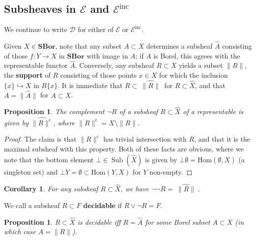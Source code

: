 \documentclass[11pt]{amsart}
\newcommand\alttext{\texorpdfstring}
\newcommand\cD{\mathcal{D}}
\newcommand\cE{\mathcal{E}}
\newcommand\cm{\mathrm{c}}
\newcommand\defword[1]{\textbf{#1}}
\newcommand\Hom{\mathrm{Hom}}
\newcommand\hto{\hookrightarrow}
\newcommand\inc{\mathrm{inc}}
\newcommand\norm[2][]{#1\lVert{#2}#1\rVert}
\newcommand\SBor{\mathbf{SBor}}
\newcommand\set[2][]{#1\{{#2}#1\}}
\newcommand\Sub{\operatorname{Sub}}
\newcommand\wh[1]{\widehat{#1}}
\theoremstyle{definition}
\theoremstyle{remark}
\theoremstyle{plain}
\newtheorem{propn}[defn]{Proposition}
\newtheorem{cor}[defn]{Corollary}
\begin{document}
\subsection{Subsheaves in \alttext{\( \cE \)}{E} and \alttext{\( \cE^{\inc} \)}{Eⁱⁿᶜ}} \label{subsec:subsheaves-in-e}
We continue to write \( \cD \) for either of \( \cE \) or \( \cE^{\inc} \).

Given \( X \in \SBor \), note that any subset \( A \subset X \) determines a subsheaf \( \wh A \) consisting of those \( f \colon Y \to X \) in \( \SBor \) with image in \( A \); if \( A \) is Borel, this agrees with the representable functor \( \wh A \).
Conversely, any subsheaf \( R \subset X \) yields a subset \( \norm{R} \), the \defword{support} of \( R \) consisting of those points \( x \in X \) for which the inclusion \( \set{x} \hto X \) in \( R \set{x} \).
It is immediate that \( R \subset \wh{\ \norm{R}\ } \) for \( R \subset \wh X \), and that \( A = \norm{\wh A} \) for \( A \subset X \).

\begin{propn}\label{propn:complement-in-rep}
  The complement \( \neg R \) of a subsheaf \( R \subset \wh X \) of a representable is given by \( \wh{\norm{R}^{\cm}} \), where \( \norm{R}^\cm = X \setminus \norm{R} \).
\end{propn}

\begin{proof}
  The claim is that \( \norm{R}^{\cm} \) has trivial intersection with \( R \), and that it is the maximal subsheaf with this property.
  Both of these facts are obvious, where we note that the bottom element \( \bot \in \Sub(\wh X) \) is given by \( \bot \emptyset = \Hom(\emptyset,X) \) (a singleton set) and \( \bot Y = \emptyset \subset \Hom(Y,X) \) for \( Y \) non-empty.
\end{proof}

\begin{cor}\label{cor:double-negations}
  For any subsheaf \( R \subset \wh X \), we have \( \neg \neg R = \wh{\ \norm{R}\ } \).
\end{cor}

We call a subsheaf \( R \subset F \) \defword{decidable} if \( R \vee \neg R = F \).

\begin{propn}\label{propn:decidable-sub-is-borel}
  \( R \subset \wh X \) is decidable iff \( R = \wh{A} \) for some Borel subset \( A \subset X \) (in which case \( A = \norm{R} \)).
\end{propn}
\end{document}
